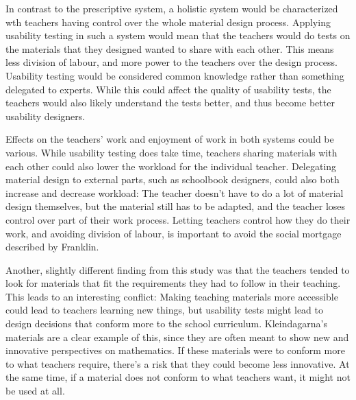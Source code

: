 In contrast to the prescriptive system, a holistic system would be characterized wth teachers having control over the whole material design process. Applying usability testing in such a system would mean that the teachers would do tests on the materials that they designed wanted to share with each other. This means less division of labour, and more power to the teachers over the design process. Usability testing would be considered common knowledge rather than something delegated to experts. While this could affect the quality of usability tests, the teachers would also likely understand the tests better, and thus become better usability designers.

Effects on the teachers' work and enjoyment of work in both systems could be various. While usability testing does take time, teachers sharing materials with each other could also lower the workload for the individual teacher. Delegating material design to external parts, such as schoolbook designers, could also both increase and decrease workload: The teacher doesn't have to do a lot of material design themselves, but the material still has to be adapted, and the teacher loses control over part of their work process. Letting teachers control how they do their work, and avoiding division of labour, is important to avoid the social mortgage described by Franklin.

Another, slightly different finding from this study was that the teachers tended to look for materials that fit the requirements they had to follow in their teaching. This leads to an interesting conflict: Making teaching materials more accessible could lead to teachers learning new things, but usability tests might lead to design decisions that conform more to the school curriculum. Kleindagarna's materials are a clear example of this, since they are often meant to show new and innovative perspectives on mathematics. If these materials were to conform more to what teachers require, there's a risk that they could become less innovative. At the same time, if a material does not conform to what teachers want, it might not be used at all.

